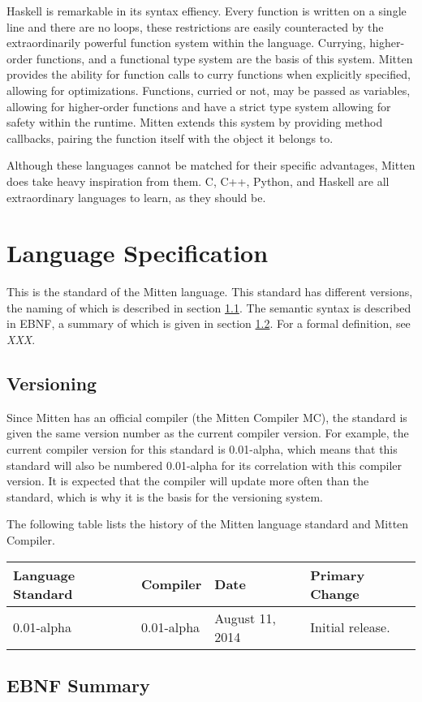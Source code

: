 \documentclass[10pt,a4paper]{article}
\begin{document}
Haskell is remarkable in its syntax effiency. Every function is written on a single line and there are no loops, these restrictions are easily counteracted by the extraordinarily powerful function system within the language. Currying, higher-order functions, and a functional type system are the basis of this system. Mitten provides the ability for function calls to curry functions when explicitly specified, allowing for optimizations. Functions, curried or not, may be passed as variables, allowing for higher-order functions and have a strict type system allowing for safety within the runtime. Mitten extends this system by providing method callbacks, pairing the function itself with the object it belongs to.

Although these languages cannot be matched for their specific advantages, Mitten does take heavy inspiration from them. C, C++, Python, and Haskell are all extraordinary languages to learn, as they should be.

\section{Language Specification}
This is the standard of the Mitten language. This standard has different versions, the naming of which is described in section \ref{sec:Versioning}. The semantic syntax is described in EBNF, a summary of which is given in section \ref{sec:EBNFSummary}. For a formal definition, see \textit{XXX}.

\subsection{Versioning}
\label{sec:Versioning}
Since Mitten has an official compiler (the Mitten Compiler MC), the standard is given the same version number as the current compiler version. For example, the current compiler version for this standard is 0.01-alpha, which means that this standard will also be numbered 0.01-alpha for its correlation with this compiler version. It is expected that the compiler will update more often than the standard, which is why it is the basis for the versioning system.

The following table lists the history of the Mitten language standard and Mitten Compiler.
\begin{tabular}{|l|l|l|l|}
\hline
\textbf{Language Standard} & \textbf{Compiler} & \textbf{Date} & \textbf{Primary Change} \\
\hline
0.01-alpha & 0.01-alpha & August 11, 2014 & Initial release. \\
\hline
\end{tabular}

\subsection{EBNF Summary}
\label{sec:EBNFSummary}
\end{document}
